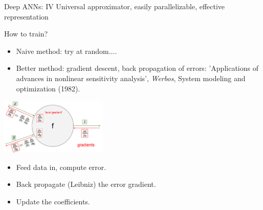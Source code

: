 \documentclass{beamer}
\begin{document}
\begin{frame}{Deep ANNs: IV}
    Universal approximator, easily parallelizable, effective representation \\

    \begin{center}
       How to train?
    \end{center}

    \begin{itemize}
      \item Naive method: try at random....
      \item Better method: gradient descent, back propagation of errors: 'Applications of advances in nonlinear sensitivity analysis', \textit{Werbos}, System modeling and optimization (1982).
    \end{itemize}

    \begin{center}
      \includegraphics[width=0.38\textwidth]{./Figures/ANNs_supervised_learning/back_prop}
    \end{center}

    \begin{itemize}
      \item Feed data in, compute error.
      \item Back propagate (Leibniz) the error gradient.
      \item Update the coefficients.
    \end{itemize}
\end{frame}
\end{document}
